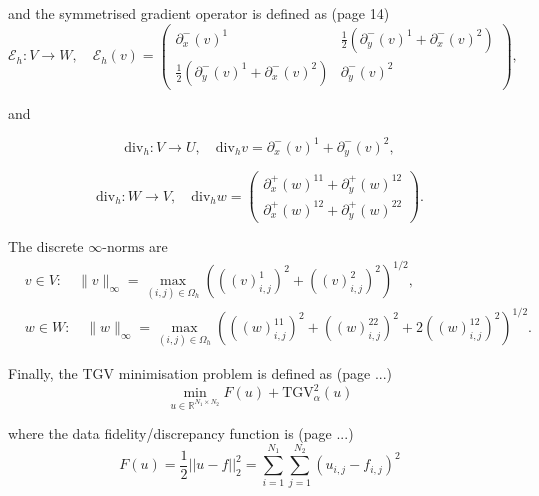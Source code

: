 \documentclass{article}
\begin{document}
and the symmetrised gradient operator is defined as (page 14)
\begin{equation}
    \mathcal{E}_h : V \rightarrow W, \quad \mathcal{E}_h (v) = 
    \begin{pmatrix}
    \partial_x^- (v)^1 &
    \frac{1}{2} \left( \partial_y^- (v)^1 + \partial_x^- (v)^2 \right) \\
    \frac{1}{2} \left( \partial_y^- (v)^1 + \partial_x^- (v)^2 \right) &
    \partial_y^- (v)^2
    \end{pmatrix},
\end{equation}

and


\begin{equation}
\mathrm{div}_h : V \rightarrow U, \quad \mathrm{div}_h v = \partial_x^- (v)^1 + \partial_y^- (v)^2,
\end{equation}

\begin{equation}
\mathrm{div}_h : W \rightarrow V, \quad \mathrm{div}_h w = 
\begin{pmatrix}
\partial_x^+ (w)^{11} + \partial_y^+ (w)^{12} \\
\partial_x^+ (w)^{12} + \partial_y^+ (w)^{22}
\end{pmatrix}.
\end{equation}

The discrete $\infty\text{-norms}$ are
\begin{equation}
    \begin{aligned}
    & v \in V : \quad \|v\|_\infty = \max_{(i,j) \in \Omega_h} \left( \left( (v)_{i,j}^1 \right)^2 + \left( (v)_{i,j}^2 \right)^2 \right)^{1/2}, \\
    & w \in W : \quad \|w\|_\infty = \max_{(i,j) \in \Omega_h} \left( \left( (w)_{i,j}^{11} \right)^2 + \left( (w)_{i,j}^{22} \right)^2 + 2 \left( (w)_{i,j}^{12} \right)^2 \right)^{1/2}.
\end{aligned}
\end{equation}


Finally, the TGV minimisation problem
is defined as (page ...)
\begin{equation}
    \min_{u \in \mathbb{R}^{N_1 \times N_2}} F(u) + \mathrm{TGV}^2_\alpha(u)
    \label{eq:tgv_minimisation_problem}
\end{equation}

where
the data fidelity/discrepancy function is (page ...)
\begin{equation}
    F(u) = \frac{1}{2} || u - f ||^2_2 = \sum_{i=1}^{N_1} \sum_{j=1}^{N_2} (u_{i,j} - f_{i,j})^2
\end{equation}
\end{document}

